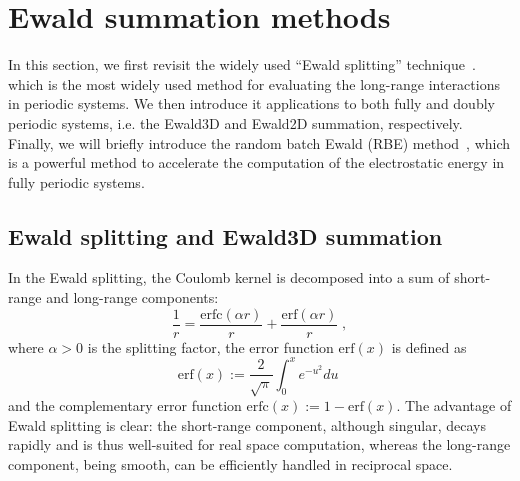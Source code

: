 \section{Ewald summation methods}

In this section, we first revisit the widely used ``Ewald splitting'' technique~\cite{ewald1921berechnung}. which is the most widely used method for evaluating the long-range interactions in periodic systems.
We then introduce it applications to both fully and doubly periodic systems, i.e. the Ewald3D and Ewald2D summation, respectively.
Finally, we will briefly introduce the random batch Ewald (RBE) method~\cite{jin2021random}, which is a powerful method to accelerate the computation of the electrostatic energy in fully periodic systems.

\subsection{Ewald splitting and Ewald3D summation} \label{sec::ewald_splitting}

In the Ewald splitting, the Coulomb kernel is decomposed into a sum of short-range and long-range components:
\begin{equation}\label{eq:ewald_decomposition}
\frac{1}{r}=\frac{\mathrm{erfc}(\alpha r)}{r}+\frac{\mathrm{erf}(\alpha r)}{r} \;,
\end{equation}
where $\alpha>0$ is the splitting factor, the error function $\mathrm{erf}(x)$ is  defined as
\begin{equation}\label{eq:erf}
    \mathrm{erf}(x):=\frac{2}{\sqrt{\pi}}\int_0^x e^{-u^2}du\;
\end{equation}
and the complementary error function $\mathrm{erfc}(x):=1-\mathrm{erf}(x)$. 
The advantage of Ewald splitting is clear:
the short-range component, although singular, decays rapidly and is thus well-suited for real space computation, whereas the long-range component, being smooth, can be efficiently handled in reciprocal space.

